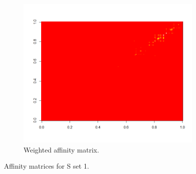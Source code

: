 \begin{figure}[h]
\begin{subfigure}{0.45\textwidth}
    \includegraphics[width = \textwidth, height = \textwidth]{s_set/s_set_1_weighted_affinity.png}
  \caption{Weighted affinity matrix.}
  \label{fig:weighted_affinity}
  \end{subfigure}
    \caption{Affinity matrices for S set 1.}
  \label{fig:set_1_affinities}
\end{figure}


